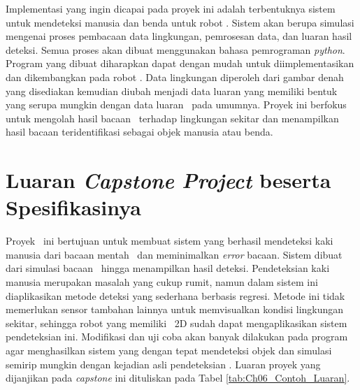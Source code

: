 Implementasi yang ingin dicapai pada proyek ini adalah terbentuknya sistem untuk mendeteksi manusia dan benda untuk robot \covid. Sistem akan berupa simulasi mengenai proses pembacaan data lingkungan, pemrosesan data, dan luaran hasil deteksi. Semua proses akan dibuat menggunakan bahasa pemrograman \textit{python}. Program yang dibuat diharapkan dapat dengan mudah untuk diimplementasikan dan dikembangkan pada robot \covid. Data lingkungan diperoleh dari gambar denah yang disediakan kemudian diubah menjadi data luaran yang memiliki bentuk yang serupa mungkin dengan data luaran \lidar\ pada umumnya. Proyek ini berfokus untuk mengolah hasil bacaan \lidar\ terhadap lingkungan sekitar dan menampilkan hasil bacaan teridentifikasi sebagai objek manusia atau benda.  

\section{Luaran \textit{Capstone Project} beserta Spesifikasinya}
\label{sec:Luaran_Capstone_Project_beserta_Spesifikasinya}

  Proyek \capstone\ ini bertujuan untuk membuat sistem yang berhasil mendeteksi kaki manusia dari bacaan mentah \lidar\ dan meminimalkan \textit{error} bacaan. Sistem dibuat dari simulasi bacaan \lidar\ hingga menampilkan hasil deteksi. Pendeteksian kaki manusia merupakan masalah yang cukup rumit, namun dalam sistem ini diaplikasikan metode deteksi yang sederhana berbasis regresi. Metode ini tidak memerlukan sensor tambahan lainnya untuk memvisualkan kondisi lingkungan sekitar, sehingga robot yang memiliki \lidar\ 2D sudah dapat mengaplikasikan sistem pendeteksian ini. Modifikasi dan uji coba akan banyak dilakukan pada program agar menghasilkan sistem yang dengan tepat mendeteksi objek dan simulasi semirip mungkin dengan kejadian asli pendeteksian \lidar. Luaran proyek yang dijanjikan pada \textit{capstone} ini dituliskan pada Tabel \ref{tab:Ch06_Contoh_Luaran}.
    
